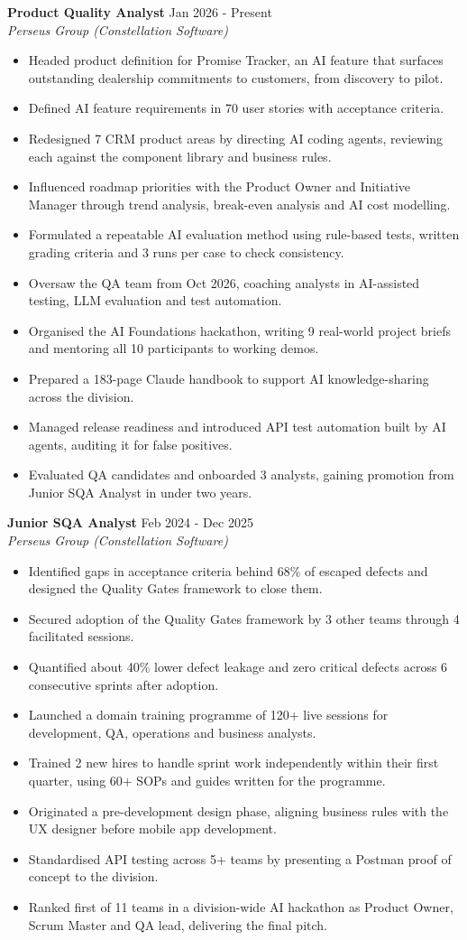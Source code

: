 \documentclass[letterpaper,11pt]{article}
\newcommand{\resumeItem}[1]{\item\small{#1 \vspace{-3.5pt}}}
\newcommand{\resumeSubheading}[4]{%
  \vspace{-2pt}\item \textbf{#1} \hfill #2 \\
  \textit{\small #3} \hfill \textit{\small #4} \vspace{-6pt}}
\newcommand{\resumeItemListStart}{\begin{itemize}[topsep=3pt]}
\newcommand{\resumeItemListEnd}{\end{itemize}\vspace{-4pt}}
\begin{document}
    \resumeSubheading
      {Product Quality Analyst}{Jan 2026 - Present}
      {Perseus Group (Constellation Software)}{}
      \resumeItemListStart
        \resumeItem{Headed product definition for Promise Tracker, an AI feature that surfaces outstanding dealership commitments to customers, from discovery to pilot.}
        \resumeItem{Defined AI feature requirements in 70 user stories with acceptance criteria.}
        \resumeItem{Redesigned 7 CRM product areas by directing AI coding agents, reviewing each against the component library and business rules.}
        \resumeItem{Influenced roadmap priorities with the Product Owner and Initiative Manager through trend analysis, break-even analysis and AI cost modelling.}
        \resumeItem{Formulated a repeatable AI evaluation method using rule-based tests, written grading criteria and 3 runs per case to check consistency.}
        \resumeItem{Oversaw the QA team from Oct 2026, coaching analysts in AI-assisted testing, LLM evaluation and test automation.}
        \resumeItem{Organised the AI Foundations hackathon, writing 9 real-world project briefs and mentoring all 10 participants to working demos.}
        \resumeItem{Prepared a 183-page Claude handbook to support AI knowledge-sharing across the division.}
        \resumeItem{Managed release readiness and introduced API test automation built by AI agents, auditing it for false positives.}
        \resumeItem{Evaluated QA candidates and onboarded 3 analysts, gaining promotion from Junior SQA Analyst in under two years.}
      \resumeItemListEnd

    \resumeSubheading
      {Junior SQA Analyst}{Feb 2024 - Dec 2025}
      {Perseus Group (Constellation Software)}{}
      \resumeItemListStart
        \resumeItem{Identified gaps in acceptance criteria behind 68\% of escaped defects and designed the Quality Gates framework to close them.}
        \resumeItem{Secured adoption of the Quality Gates framework by 3 other teams through 4 facilitated sessions.}
        \resumeItem{Quantified about 40\% lower defect leakage and zero critical defects across 6 consecutive sprints after adoption.}
        \resumeItem{Launched a domain training programme of 120+ live sessions for development, QA, operations and business analysts.}
        \resumeItem{Trained 2 new hires to handle sprint work independently within their first quarter, using 60+ SOPs and guides written for the programme.}
        \resumeItem{Originated a pre-development design phase, aligning business rules with the UX designer before mobile app development.}
        \resumeItem{Standardised API testing across 5+ teams by presenting a Postman proof of concept to the division.}
        \resumeItem{Ranked first of 11 teams in a division-wide AI hackathon as Product Owner, Scrum Master and QA lead, delivering the final pitch.}
      \resumeItemListEnd
\end{document}
